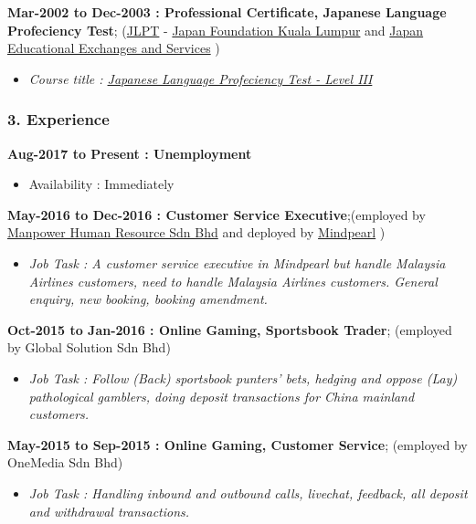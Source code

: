 \documentclass[]{article}
\providecommand{\tightlist}{%
  \setlength{\itemsep}{0pt}\setlength{\parskip}{0pt}}
\begin{document}
\textbf{Mar-2002 to Dec-2003 : Professional Certificate, Japanese
Language Profeciency Test}; (\href{http://www.jlpt.jp/index.html}{JLPT}
- \href{http://www.jfkl.org.my/}{Japan Foundation Kuala Lumpur} and
\href{http://www.jees.or.jp/index.htm}{Japan Educational Exchanges and
Services} )

\begin{itemize}
\tightlist
\item
  \emph{Course title :
  \href{https://raw.githubusercontent.com/scibrokes/owner/master/documents/JLPT\%20Certificate.jpg}{Japanese
  Language Profeciency Test - Level III}}
\end{itemize}

\subsubsection{3. Experience}\label{experience}

\textbf{Aug-2017 to Present : Unemployment}

\begin{itemize}
\tightlist
\item
  Availability : Immediately
\end{itemize}

\textbf{May-2016 to Dec-2016 : Customer Service Executive};(employed by
\href{http://www.manpower.com.my/}{Manpower Human Resource Sdn Bhd} and
deployed by \href{https://www.mindpearl.com/}{Mindpearl} )

\begin{itemize}
\tightlist
\item
  \emph{Job Task : A customer service executive in Mindpearl but handle
  Malaysia Airlines customers, need to handle Malaysia Airlines
  customers. General enquiry, new booking, booking amendment.}
\end{itemize}

\textbf{Oct-2015 to Jan-2016 : Online Gaming, Sportsbook Trader};
(employed by Global Solution Sdn Bhd)

\begin{itemize}
\tightlist
\item
  \emph{Job Task : Follow (Back) sportsbook punters' bets, hedging and
  oppose (Lay) pathological gamblers, doing deposit transactions for
  China mainland customers.}
\end{itemize}

\textbf{May-2015 to Sep-2015 : Online Gaming, Customer Service};
(employed by OneMedia Sdn Bhd)

\begin{itemize}
\tightlist
\item
  \emph{Job Task : Handling inbound and outbound calls, livechat,
  feedback, all deposit and withdrawal transactions.}
\end{itemize}
\end{document}
